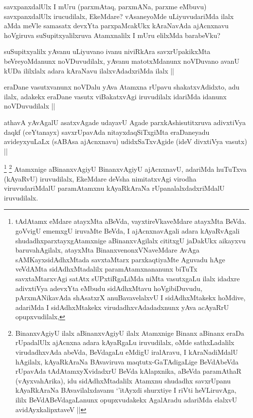 \begin{artha}
savxpanxdalUlx I mUru (parxmAtaq, parxmANa, parxme eMbuvu) savxpanxdalUlx irucudilalx, EkeMdare? vAsaneyoMde uLiyuvudariMda ilalx aMda meVle samasatx devxYta parxpaMcakUkx kAraNavAda ajAcnxnavu hoVgiruva suSupitxyalilxruva Atamxnalilx I mUru elilxMda barabeVku? 
\end{artha}

\begin{artha}
suSupitxyalilx yAvanu uLiyuvano ivanu niviRkAra savxrUpakikxMta beVreyoMdanunx noVDuvudilalx, yAvanu matotxMdanunx noVDuvano avanU kUDa ililxlalx adara kAraNavu ilalxvAdadxriMda ilalx ||
\end{artha}

\begin{artha}
eraDane vasutxvanunx noVDalu yAva Atamxna rUpavu shakatxvAdidxto, adu ilalx, adakekx eraDane vasutx viBakatxvAgi iruvudilalx idariMda idanunx noVDuvudilalx ||
\end{artha}

\begin{artha}
athavA yAvAgalU asatxvAgade udayavU Agade parxkAshisutitxruva adivxtiVya daqkf (ceYtanayx) savxrUpavAda nitayxdaqSiTxgiMta eraDaneyadu avideyxyuLaLx (sABAsa ajAcnxnavu) udidxSaTxvAgide (ideV divxtiVya vasutx) ||
\end{artha}



\begin{artha}
\footnote{tAdAtamx eMdare atayxMta aBeVda, vayxtireVkaveMdare atayxMta BeVda. goVvigU ememxgU iruvaMte BeVda, I ajAcnxnavAgali adara kAyaRvAgali shudadhxparxtayxgAtamxnige aBinanxvAgilalx cititxgU jaDakUkx aikayxvu baruvahAgilalx, atayxMta BinanxvenonxVNaveMdare AvAga sAMKayxsidAdhxMtada savxtaMtarx parxkaqtiyaMte Aguvadu hAge veVdAMta sidAdhxMtadalilx paramAtamxnananunx biTuTx savxtaMtarxvAgi satAtx sUPxtiRgaLiMda niMta vasutxgaLu ilalx idadxre adivxtiVya adevxYta eMbudu sidAdhxMtavu hoVgibiDuvudu, pArxmANikavAda shAsatxrX anuBavavelalxvU I sidAdhxMtakekx hoMdive, adariMda I sidAdhxMtakekx virudadhxvAdadadxnunx yAva acAyaRrU opupxvudilalx,}
\footnote{BinanxvAgiyU ilalx aBinanxvAgiyU ilalx Atamxnige Binanx aBinanx eraDa rUpadalUlx ajAcnxna adara kAyaRgaLu iruvudilalx, oMde sathxLadalilx virudadhxvAda abeVda, BeVdagaLu eMdigU iralAravu, I kAraNadiMdalU hAgilalx, kAyaRkAraNa BAvaviruva maqtutx-GaTAdigaLige BeVdAbeVda rUpavAda tAdAtamxyXvidadxrU BeVda kAlapxnika, aBeVda paramAthaR (vAyxvahArika), idu sidAdhxMtadalilx Atamxnu shudadhx savxrUpanu kAyaRkAraNa BAvavilalxdavanu `\stext'itAyxdi shurxtiye I riVti heVLiruvAga, ililx BeVdABeVdagaLanunx opupxvudakekx AgalAradu adariMda elalxvU avidAyxkalipxtaveV ||}
Atamxnige aBinanxvAgiyU BinanxvAgiyU ajAcnxnavU, adariMda huTuTxva (kAyaRvU) iruvudilalx, EkeMdare deVsha nimitatxvAgi virodha viruvudariMdalU paramAtamxnu kAyaRkAraNa rUpanalalxdadxriMdalU iruvudilalx.
\end{artha}

